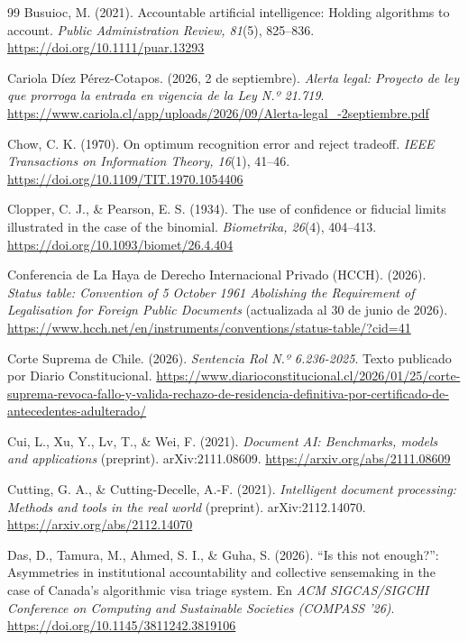 \documentclass[11pt,a4paper]{article}
\begin{document}
\begin{thebibliography}{99}
Busuioc, M. (2021). Accountable artificial intelligence: Holding algorithms to account. \emph{Public Administration Review, 81}(5), 825--836. \url{https://doi.org/10.1111/puar.13293}

Cariola Díez Pérez-Cotapos. (2026, 2 de septiembre). \emph{Alerta legal: Proyecto de ley que prorroga la entrada en vigencia de la Ley N.º 21.719}. \url{https://www.cariola.cl/app/uploads/2026/09/Alerta-legal_-2septiembre.pdf}

Chow, C. K. (1970). On optimum recognition error and reject tradeoff. \emph{IEEE Transactions on Information Theory, 16}(1), 41--46. \url{https://doi.org/10.1109/TIT.1970.1054406}

Clopper, C. J., \& Pearson, E. S. (1934). The use of confidence or fiducial limits illustrated in the case of the binomial. \emph{Biometrika, 26}(4), 404--413. \url{https://doi.org/10.1093/biomet/26.4.404}

Conferencia de La Haya de Derecho Internacional Privado (HCCH). (2026). \emph{Status table: Convention of 5 October 1961 Abolishing the Requirement of Legalisation for Foreign Public Documents} (actualizada al 30 de junio de 2026). \url{https://www.hcch.net/en/instruments/conventions/status-table/?cid=41}

Corte Suprema de Chile. (2026). \emph{Sentencia Rol N.º 6.236-2025}. Texto publicado por Diario Constitucional. \url{https://www.diarioconstitucional.cl/2026/01/25/corte-suprema-revoca-fallo-y-valida-rechazo-de-residencia-definitiva-por-certificado-de-antecedentes-adulterado/}

Cui, L., Xu, Y., Lv, T., \& Wei, F. (2021). \emph{Document AI: Benchmarks, models and applications} (preprint). arXiv:2111.08609. \url{https://arxiv.org/abs/2111.08609}

Cutting, G. A., \& Cutting-Decelle, A.-F. (2021). \emph{Intelligent document processing: Methods and tools in the real world} (preprint). arXiv:2112.14070. \url{https://arxiv.org/abs/2112.14070}

Das, D., Tamura, M., Ahmed, S. I., \& Guha, S. (2026). ``Is this not enough?'': Asymmetries in institutional accountability and collective sensemaking in the case of Canada's algorithmic visa triage system. En \emph{ACM SIGCAS/SIGCHI Conference on Computing and Sustainable Societies (COMPASS '26)}. \url{https://doi.org/10.1145/3811242.3819106}


\end{thebibliography}
\end{document}
